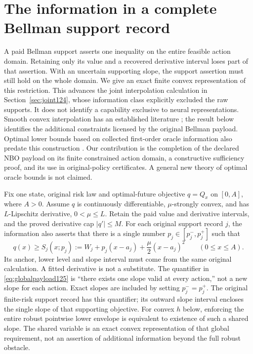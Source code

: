 \section{The information in a complete Bellman support record}
\label{sec:fullsupport125}

A paid Bellman support asserts one inequality on the entire feasible action
domain. Retaining only its value and a recovered derivative interval loses
part of that assertion. With an uncertain supporting slope, the support
assertion must still hold on the whole domain. We give an exact finite
convex representation of this restriction. This advances the joint interpolation
calculation in Section~\ref{sec:joint124}, whose information class explicitly
excluded the raw supports. It does not identify a capability exclusive to
neural representations. Smooth convex interpolation has an established
literature \citep{THG2017Interpolation122}; the result below identifies the
additional constraints licensed by the original Bellman payload.
Optimal lower bounds based on collected first-order oracle information
also predate this construction \citep{FloreaNesterov2024Oracle125}.
Our contribution is the completion of the declared NBO payload on its
finite constrained action domain, a constructive sufficiency proof, and
its use in original-policy certificates. A general new theory of optimal
oracle bounds is not claimed.

Fix one state, original risk law and optimal-future objective
$q=Q_x$ on $[0,A]$, where $A>0$. Assume $q$ is continuously
differentiable, $\mu$-strongly convex, and has $L$-Lipschitz derivative,
$0<\mu\le L$. Retain the paid value and derivative intervals, and
the proved derivative cap $|q'|\le M$. For each original support record
$j$, the information also asserts that there is a single number
$p_j\in[p_j^-,p_j^+]$ such that
\begin{equation}\label{eq:globalpayload125}
 q(x)\ge S_j(x;p_j):=
 W_j+p_j(x-a_j)+\frac\mu2(x-a_j)^2
 \qquad(0\le x\le A).
\end{equation}
Its anchor, lower level and slope interval must come from the same
original calculation. A fitted derivative is not a substitute. The
quantifier in \eqref{eq:globalpayload125} is ``there exists one slope
valid at every action,'' not a new slope for each action. Exact slopes
are included by setting $p_j^-=p_j^+$. The original finite-risk support
record has this quantifier; its outward slope interval encloses the
single slope of that supporting objective.
For convex $h$ below, enforcing the entire robust pointwise lower envelope
is equivalent to existence of such a shared slope. The shared variable is
an exact convex representation of that global requirement, not an assertion
of additional information beyond the full robust obstacle.


